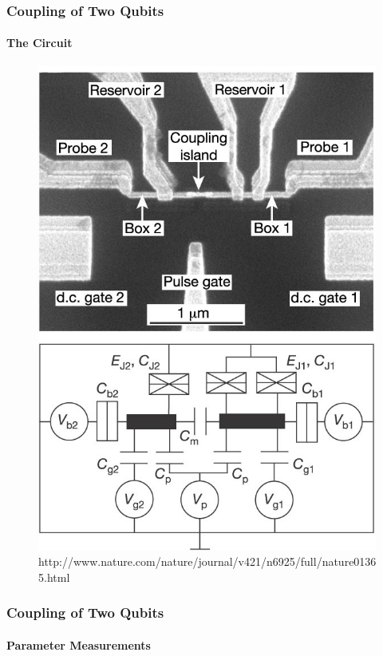 \documentclass{beamer}
\begin{document}

\begin{frame}
    \frametitle{Coupling of Two Qubits}
    \framesubtitle{The Circuit}
    \begin{figure}[ht!]
        \centering
        \includegraphics[height=0.7\textheight]{img/circuit-sem-and-diagram.jpg}
        \caption{http://www.nature.com/nature/journal/v421/n6925/full/nature01365.html}
    \end{figure}
\end{frame}


\begin{frame}
    \frametitle{Coupling of Two Qubits}
    \framesubtitle{Parameter Measurements}
\end{frame}

\end{document}
